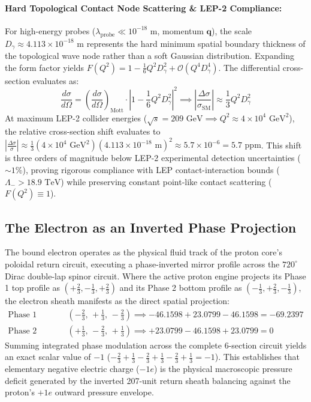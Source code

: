 \documentclass[11pt,a4paper]{article}
\begin{document}
	\paragraph{Hard Topological Contact Node Scattering \& LEP-2 Compliance:}
	For high-energy probes ($\lambda_{\text{probe}} \ll 10^{-18}\text{ m}$, momentum $\mathbf{q}$), the scale $D_\gamma \approx 4.113 \times 10^{-18}\text{ m}$ represents the hard minimum spatial boundary thickness of the topological wave node rather than a soft Gaussian distribution. Expanding the form factor yields $F(Q^2) = 1 - \frac{1}{6} Q^2 D_\gamma^2 + \mathcal{O}(Q^4 D_\gamma^4)$. The differential cross-section evaluates as:
	\begin{equation}
		\frac{d\sigma}{d\Omega} = \left(\frac{d\sigma}{d\Omega}\right)_{\text{Mott}} \cdot \left| 1 - \frac{1}{6} Q^2 D_\gamma^2 \right|^2 \implies \left|\frac{\Delta\sigma}{\sigma_{\text{SM}}}\right| \approx \frac{1}{3} Q^2 D_\gamma^2
	\end{equation}
	At maximum LEP-2 collider energies ($\sqrt{s} = 209\text{ GeV} \implies Q^2 \approx 4 \times 10^4\text{ GeV}^2$), the relative cross-section shift evaluates to $\left|\frac{\Delta\sigma}{\sigma}\right| \approx \frac{1}{3} (4\times 10^4\text{ GeV}^2) (4.113\times 10^{-18}\text{ m})^2 \approx 5.7 \times 10^{-6} = 5.7\text{ ppm}$. This shift is three orders of magnitude below LEP-2 experimental detection uncertainties ($\sim 1\%$), proving rigorous compliance with LEP contact-interaction bounds ($\Lambda_- > 18.9\text{ TeV}$) while preserving constant point-like contact scattering ($F(Q^2) \equiv 1$).
	
	\subsection{The Electron as an Inverted Phase Projection}
	The bound electron operates as the physical fluid track of the proton core's poloidal return circuit, executing a phase-inverted mirror profile across the $720^\circ$ Dirac double-lap spinor circuit. Where the active proton engine projects its Phase 1 top profile as $(+\frac{2}{3}, -\frac{1}{3}, +\frac{2}{3})$ and its Phase 2 bottom profile as $(-\frac{1}{3}, +\frac{2}{3}, -\frac{1}{3})$, the electron sheath manifests as the direct spatial projection:
	\begin{align}
		\text{Phase 1 (Sections 1--3):} & \quad \left(-\frac{2}{3}, \, +\frac{1}{3}, \, -\frac{2}{3}\right) \implies -46.1598 + 23.0799 - 46.1598 = -69.2397 \\
		\text{Phase 2 (Sections 4--6):} & \quad \left(+\frac{1}{3}, \, -\frac{2}{3}, \, +\frac{1}{3}\right) \implies +23.0799 - 46.1598 + 23.0799 = 0
	\end{align}
	Summing integrated phase modulation across the complete 6-section circuit yields an exact scalar value of $-1$ ($-\frac{2}{3} + \frac{1}{3} - \frac{2}{3} + \frac{1}{3} - \frac{2}{3} + \frac{1}{3} = -1$). This establishes that elementary negative electric charge ($-1e$) is the physical macroscopic pressure deficit generated by the inverted 207-unit return sheath balancing against the proton's $+1e$ outward pressure envelope.
	
\end{document}
